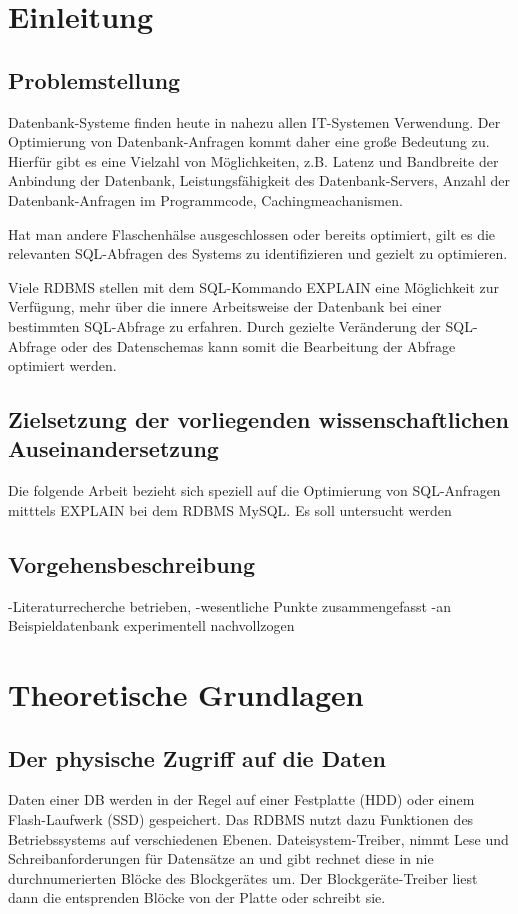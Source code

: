 
\section{Einleitung}

\subsection{Problemstellung}
Datenbank-Systeme finden heute in nahezu allen IT-Systemen Verwendung.
Der Optimierung von Datenbank-Anfragen kommt daher eine große Bedeutung zu.
Hierfür gibt es eine Vielzahl von Möglichkeiten, z.B. Latenz und Bandbreite der Anbindung der Datenbank, Leistungsfähigkeit des Datenbank-Servers, Anzahl der Datenbank-Anfragen im Programmcode, Cachingmeachanismen.

Hat man andere Flaschenhälse ausgeschlossen oder bereits optimiert,  gilt es die relevanten SQL-Abfragen des Systems zu identifizieren und gezielt zu optimieren.

Viele RDBMS stellen mit dem SQL-Kommando EXPLAIN eine Möglichkeit zur Verfügung, mehr über die innere Arbeitsweise der Datenbank bei einer bestimmten SQL-Abfrage zu erfahren.
Durch gezielte Veränderung der SQL-Abfrage oder des Datenschemas kann somit die Bearbeitung der Abfrage optimiert werden.

\subsection{Zielsetzung der vorliegenden  wissenschaftlichen  Auseinandersetzung}
Die folgende Arbeit bezieht sich speziell auf die Optimierung von SQL-Anfragen mitttels EXPLAIN bei dem RDBMS MySQL.
Es soll untersucht werden

\subsection{Vorgehensbeschreibung}
-Literaturrecherche betrieben,
-wesentliche Punkte zusammengefasst
-an Beispieldatenbank experimentell nachvollzogen

\section{Theoretische Grundlagen}
\subsection{Der physische Zugriff auf die Daten}
Daten einer DB werden in der Regel auf einer Festplatte (HDD) oder einem Flash-Laufwerk (SSD) gespeichert.
Das RDBMS nutzt dazu Funktionen des Betriebssystems auf verschiedenen Ebenen.
Dateisystem-Treiber, nimmt Lese und Schreibanforderungen für Datensätze an und gibt rechnet diese in nie durchnumerierten Blöcke des Blockgerätes um. Der Blockgeräte-Treiber liest dann die entsprenden Blöcke von der Platte oder schreibt sie.

